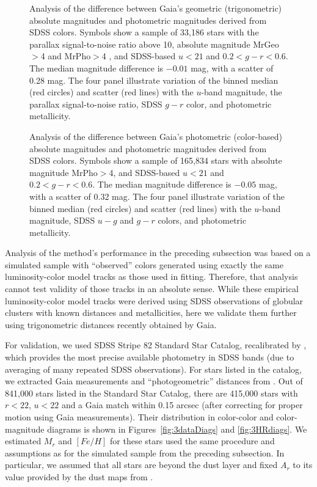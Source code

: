 \begin{figure}[ht!]
\caption{Analysis of the difference between Gaia's geometric (trigonometric) absolute magnitudes and photometric magnitudes
  derived from SDSS colors. Symbols show a sample of 33,186 stars with the parallax signal-to-noise ratio above 10, absolute
  magnitude MrGeo$>$4 and MrPho$>$4 , and SDSS-based $u<21$ and $0.2 < g-r < 0.6$. The median magnitude difference is
  $-0.01$ mag, with a scatter of 0.28 mag. The four panel illustrate variation of the binned median (red circles) and scatter (red
  lines) with the $u$-band magnitude, the parallax signal-to-noise ratio, SDSS $g-r$ color, and photometric metallicity.} 
\label{fig:gaiasdss1}
\end{figure}




\begin{figure}[ht!]
\caption{Analysis of the difference between Gaia's photometric (color-based) absolute magnitudes and photometric magnitudes
  derived from SDSS colors. Symbols show a sample of 165,834 stars with absolute magnitude MrPho$>$4, and SDSS-based $u<21$
  and $0.2 < g-r < 0.6$. The median magnitude difference is $-0.05$ mag, with a scatter of 0.32 mag. The four panel illustrate
  variation of the binned median (red circles) and scatter (red lines) with the $u$-band magnitude, SDSS $u-g$ and $g-r$ colors,
  and photometric metallicity.}
\label{fig:gaiasdss2}
\end{figure}



Analysis of the method's performance in the preceding subsection was based on a simulated sample with ``observed'' colors generated using
exactly the same luminosity-color model tracks as those used in fitting. Therefore, that analysis cannot test validity of those tracks in an absolute sense.
While these empirical luminosity-color model tracks were derived using SDSS observations of
globular clusters with known distances and metallicities, here we validate them further using trigonometric distances recently obtained by Gaia.  

For validation, we used SDSS Stripe 82 Standard Star Catalog, recalibrated by \cite{2021MNRAS.505.5941T},
which provides the most precise available photometry in SDSS bands (due to averaging of many repeated SDSS observations). 
For stars listed in the catalog, we extracted Gaia measurements and ``photogeometric'' distances from 
\cite{bailer-jones_estimating_2021}. Out of 841,000 stars listed in the Standard Star Catalog, there are 415,000 stars with $r < 22$, $u<22$ and a Gaia
match within 0.15 arcsec (after correcting for proper motion using Gaia measurements). Their distribution in color-color and
color-magnitude diagrams is shown in Figures~\ref{fig:3dataDiags} and \ref{fig:3HRdiags}. 
We estimated $M_r$ and $[Fe/H]$ for these stars used the same procedure and assumptions as for the simulated sample from the
preceding subsection. In particular, we assumed that all stars are beyond the dust layer and fixed $A_r$ to its value provided by the dust
maps from \cite{schlegel_maps_1998}.


